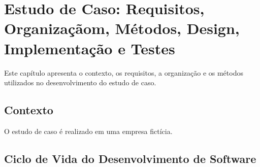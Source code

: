 \chapter{Estudo de Caso: Requisitos, Organizaçãom, Métodos, Design, Implementação e Testes }
\label{cap:estudo_caso1}
Este capítulo apresenta o contexto, os requisitos, a organização e os métodos utilizados no desenvolvimento do estudo de caso.

\section{Contexto}
\label{section:contexto}
O estudo de caso é realizado em uma empresa fictícia.

\section{Ciclo de Vida do Desenvolvimento de Software}
